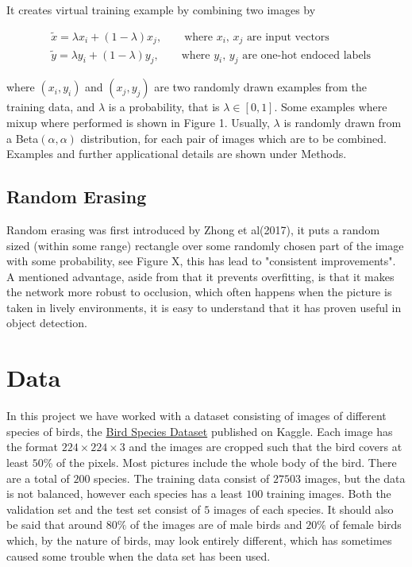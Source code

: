 \documentclass{article}
\begin{document}
It creates virtual training example by combining two images by 

\begin{align*}
&\tilde{x} = \lambda x_i + (1-\lambda) x_j, \qquad \text{where $x_i$, $x_j$ are input vectors} \\
&\tilde{y} = \lambda y_i + (1-\lambda) y_j, \qquad \text{where $y_i$, $y_j$ are one-hot endoced labels}
\end{align*}


where $(x_i, y_i)$ and $(x_j, y_j)$ are two randomly drawn examples from the training data, and $\lambda$ 
is a probability, that is $\lambda \in [0,1]$. Some examples where mixup where performed is shown in Figure 1.  Usually, $\lambda$ is randomly drawn from a Beta$(\alpha, \alpha)$ 
distribution, for each pair of images which are to be combined. Examples and further applicational details are shown under Methods. 


\subsection{Random Erasing}
Random erasing was first introduced by Zhong et al(2017), it puts a random sized (within some range) rectangle over some randomly chosen part of the image with some probability, see Figure X, this has lead to "consistent improvements". A mentioned advantage, aside from that it prevents overfitting, is that it makes the network more robust to occlusion, which often happens when the picture is taken in lively environments, it is easy to understand that it has proven useful in object detection. 

\section{Data}

In this project we have worked with a dataset consisting of images of different species of birds, the  
\href{https://www.kaggle.com/gpiosenka/100-bird-species}{Bird Species Dataset} published on Kaggle. Each image has the format $224 \times 224 \times 3$ and the images are cropped such that the bird covers at least $50$\% of the pixels. Most pictures include the whole body of the bird.
There are 
a total of $200$ species. The training data consist of $27503$ images, but the data is not balanced, however each species has a least $100$ training images. 
Both the validation set and the test set consist of $5$ images of each species. 
It should also be said that around $80\%$ of the images are of male birds and $20\%$ of female 
birds which, by the nature of birds, may look entirely different, which has sometimes caused some trouble when the data set has been used.
\end{document}
